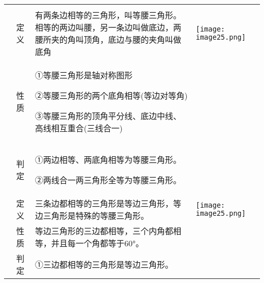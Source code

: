 \begin{longtable}[]{@{}llll@{}}
\toprule
\endhead
& & &\tabularnewline
& 定义 &
有两条边相等的三角形，叫等腰三角形。相等的两边叫腰，另一条边叫做底边，两腰所夹的角叫顶角，底边与腰的夹角叫做底角
&
\texttt{[image: image25.png]}\tabularnewline
\begin{minipage}[t]{0.22\columnwidth}\raggedright
\strut
\end{minipage} & \begin{minipage}[t]{0.22\columnwidth}\raggedright
性质\strut
\end{minipage} & \begin{minipage}[t]{0.22\columnwidth}\raggedright
①等腰三角形是轴对称图形

②等腰三角形的两个底角相等(等边对等角)

③等腰三角形的顶角平分线、底边中线、高线相互重合(三线合一)\strut
\end{minipage} & \begin{minipage}[t]{0.22\columnwidth}\raggedright
\strut
\end{minipage}\tabularnewline
\begin{minipage}[t]{0.22\columnwidth}\raggedright
\strut
\end{minipage} & \begin{minipage}[t]{0.22\columnwidth}\raggedright
判定\strut
\end{minipage} & \begin{minipage}[t]{0.22\columnwidth}\raggedright
①两边相等、两底角相等为等腰三角形。

②两线合一两三角形全等为等腰三角形。\strut
\end{minipage} & \begin{minipage}[t]{0.22\columnwidth}\raggedright
\strut
\end{minipage}\tabularnewline
& 定义 &
三条边都相等的三角形是等边三角形，等边三角形是特殊的等腰三角形。 &
\texttt{[image: image25.png]}\tabularnewline
& 性质 & 等边三角形的三边都相等，三个内角都相等，并且每一个角都等于60°。
&\tabularnewline
\begin{minipage}[t]{0.22\columnwidth}\raggedright
\strut
\end{minipage} & \begin{minipage}[t]{0.22\columnwidth}\raggedright
判定\strut
\end{minipage} & \begin{minipage}[t]{0.22\columnwidth}\raggedright
①三边都相等的三角形是等边三角形。


\end{minipage}
\end{longtable}
